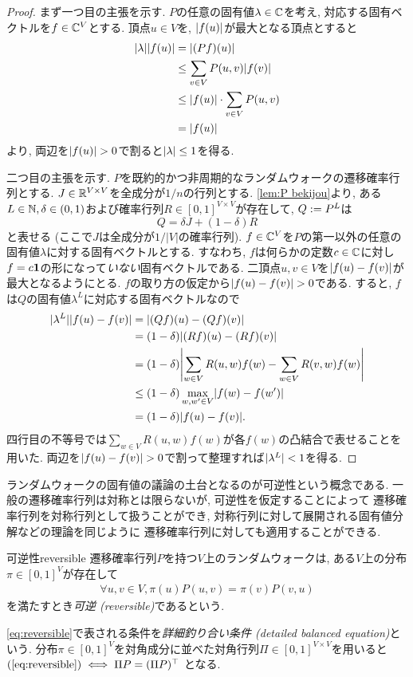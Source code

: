 \begin{proof}
  まず一つ目の主張を示す.
  $P$の任意の固有値$\lambda \in \mathbb{C}$を考え, 対応する固有ベクトルを$f \in \mathbb{C}^V$とする.
  頂点$u\in V$を, $\lvert f(u)\rvert$が最大となる頂点とすると
  \begin{align*}
    \abs{\lambda} \abs{f(u)} &= \abs*{(Pf)(u)} \\
    &\le \sum_{v\in V} P(u,v) \abs*{f(v)} \\
    &\le \abs{f(u)}\cdot \sum_{v\in V} P(u,v) \\
    &= \abs{f(u)}
  \end{align*}
  より, 両辺を$\lvert f(u)\rvert>0$で割ると$\lvert\lambda\rvert\le 1$を得る.

  二つ目の主張を示す.
  $P$を既約的かつ非周期的なランダムウォークの遷移確率行列とする.
  $J\in\mathbb{R}^{V\times V}$を全成分が$1/n$の行列とする.
  \cref{lem:P bekijou}より, ある$L\in\mathbb{N},\delta\in (0,1)$および確率行列$R\in[0,1]^{V\times V}$が存在して, $Q\mathrel{:=} P^L$は
  \[
    Q = \delta J + (1 - \delta) R
  \]
  と表せる (ここで$J$は全成分が$1/|V|$の確率行列).
  $f\in \mathbb{C}^V$を$P$の第一以外の任意の固有値$\lambda$に対する固有ベクトルとする.
  すなわち, $f$は何らかの定数$c\in\mathbb{C}$に対し$f=c\mathbf{1}$の形になって\emph{いない}固有ベクトルである.
  二頂点$u,v\in V$を$\lvert f(u) - f(v)\rvert$が最大となるようにとる.
  $f$の取り方の仮定から$\lvert f(u) - f(v)\rvert > 0$である.
  すると, $f$は$Q$の固有値$\lambda^L$に対応する固有ベクトルなので
  \begin{align*}
    \abs{\lambda^L}\abs{f(u) - f(v)} &= \abs*{(Qf)(u) - (Qf)(v)} \\
    &= (1-\delta)\abs*{(Rf)(u) - (Rf)(v)} \\
    &= (1-\delta) \abs*{ \sum_{w\in V}R(u,w)f(w) - \sum_{w\in V} R(v,w)f(w)} \\
    &\le (1-\delta)\max_{w,w'\in V}\abs*{f(w) - f(w')} \\
    &=(1-\delta)\abs{f(u) - f(v)}.
  \end{align*}
  四行目の不等号では$\sum_{w\in V}R(u,w)f(w)$が各$f(w)$の凸結合で表せることを用いた.
  両辺を$\lvert f(u) - f(v)\rvert > 0$で割って整理すれば$\lvert\lambda^L\rvert<1$を得る.
\end{proof}
%

ランダムウォークの固有値の議論の土台となるのが可逆性という概念である.
一般の遷移確率行列は対称とは限らないが, 可逆性を仮定することによって
遷移確率行列を対称行列として扱うことができ,
対称行列に対して展開される固有値分解などの理論を同じように
遷移確率行列に対しても適用することができる.
%
\begin{definition}{可逆性}{reversible}
    遷移確率行列$P$を持つ$V$上のランダムウォークは,
    ある$V$上の分布$\pi \in [0,1]^V$が存在して
    \begin{align}
        \forall u,v\in V,\pi(u) P(u,v) = \pi(v) P(v,u) \label{eq:reversible}
    \end{align}
    を満たすとき\emph{可逆 (reversible)}であるという.
\end{definition}
\cref{eq:reversible}で表される条件を\emph{詳細釣り合い条件 (detailed balanced equation)}という.
分布$\pi\in [0,1]^V$を対角成分に並べた対角行列$\Pi\in[0,1]^{V\times V}$を用いると
$(\ref{eq:reversible}) \iff \Pi P = (\Pi P)^{\top}$
となる.

